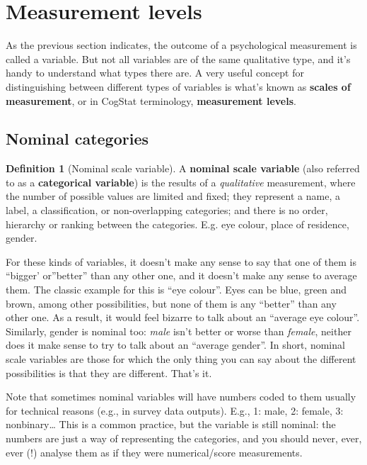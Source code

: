 \documentclass[
  11pt,
]{book}
\theoremstyle{definition}
\newtheorem{definition}{Definition}[chapter]
\theoremstyle{definition}
\theoremstyle{definition}
\theoremstyle{definition}
\theoremstyle{remark}
\begin{document}
\hypertarget{scales}{%
\section{Measurement levels}\label{scales}}

As the previous section indicates, the outcome of a psychological measurement is called a variable. But not all variables are of the same qualitative type, and it's handy to understand what types there are. A very useful concept for distinguishing between different types of variables is what's known as \textbf{scales of measurement}, or in CogStat terminology, \textbf{measurement levels}.

\hypertarget{nominalscale}{%
\subsection{Nominal categories}\label{nominalscale}}

\begin{definition}[Nominal scale variable]
\protect\hypertarget{def:defnominal}{}\label{def:defnominal}A \textbf{nominal scale variable} (also referred to as a \textbf{categorical variable}) is the results of a \emph{qualitative} measurement, where the number of possible values are limited and fixed; they represent a name, a label, a classification, or non-overlapping categories; and there is no order, hierarchy or ranking between the categories. E.g. eye colour, place of residence, gender.
\end{definition}

For these kinds of variables, it doesn't make any sense to say that one of them is ``bigger' or''better'' than any other one, and it doesn't make any sense to average them. The classic example for this is ``eye colour''. Eyes can be blue, green and brown, among other possibilities, but none of them is any ``better'' than any other one. As a result, it would feel bizarre to talk about an ``average eye colour''. Similarly, gender is nominal too: \emph{male} isn't better or worse than \emph{female}, neither does it make sense to try to talk about an ``average gender''. In short, nominal scale variables are those for which the only thing you can say about the different possibilities is that they are different. That's it.

Note that sometimes nominal variables will have numbers coded to them usually for technical reasons (e.g., in survey data outputs). E.g., 1: male, 2: female, 3: nonbinary\ldots{} This is a common practice, but the variable is still nominal: the numbers are just a way of representing the categories, and you should never, ever, ever (!) analyse them as if they were numerical/score measurements.
\end{document}
